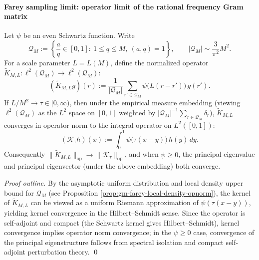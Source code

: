 \paragraph{Farey sampling limit: operator limit of the rational frequency Gram matrix}
\begin{theorem}\label{thm:gm-farey-sampling-operator-limit}
Let \(\psi\) be an even Schwartz function. Write
\[
\mathcal{Q}_M:=\left\{\frac{a}{q}\in[0,1]:\ 1\le q\le M,\ (a,q)=1\right\},
\qquad
|\mathcal{Q}_M|\sim \frac{3}{\pi^2}M^2.
\]
For a scale parameter \(L=L(M)\), define the normalized operator \(\widetilde K_{M,L}:\ell^2(\mathcal{Q}_M)\to \ell^2(\mathcal{Q}_M)\):
\[
(\widetilde K_{M,L}g)(r)
:=\frac{1}{|\mathcal{Q}_M|}\sum_{r'\in\mathcal{Q}_M}\psi\!\bigl(L(r-r')\bigr)\,g(r').
\]
If \(L/M^2\to\tau\in[0,\infty)\), then under the empirical measure embedding (viewing \(\ell^2(\mathcal{Q}_M)\) as the \(L^2\) space on \([0,1]\) weighted by \(|\mathcal{Q}_M|^{-1}\sum_{r\in\mathcal{Q}_M}\delta_r\)), \(\widetilde K_{M,L}\) converges in operator norm to the integral operator on \(L^2([0,1])\):
\[
(\mathcal{K}_\tau h)(x):=\int_0^1 \psi\!\bigl(\tau(x-y)\bigr)\,h(y)\,dy.
\]
Consequently \(\|\widetilde K_{M,L}\|_{\mathrm{op}}\to \|\mathcal{K}_\tau\|_{\mathrm{op}}\), and when \(\psi\ge 0\), the principal eigenvalue and principal eigenvector (under the above embedding) both converge.
\end{theorem}

\begin{proof}[Proof outline]
By the asymptotic uniform distribution and local density upper bound for \(\mathcal{Q}_M\) (see Proposition \ref{prop:gm-farey-local-density-opnorm}), the kernel of \(\widetilde K_{M,L}\) can be viewed as a uniform Riemann approximation of \(\psi(\tau(x-y))\), yielding kernel convergence in the Hilbert--Schmidt sense.
Since the operator is self-adjoint and compact (the Schwartz kernel gives Hilbert--Schmidt), kernel convergence implies operator norm convergence; in the \(\psi\ge 0\) case, convergence of the principal eigenstructure follows from spectral isolation and compact self-adjoint perturbation theory. \qed
\end{proof}

